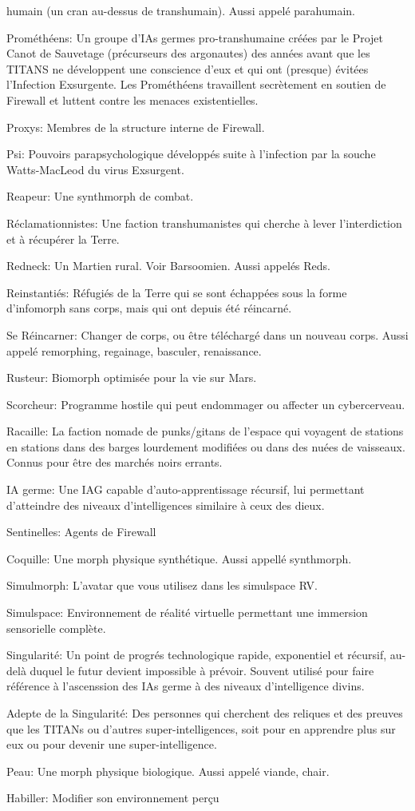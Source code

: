 humain (un cran au-dessus de transhumain). Aussi appelé parahumain. \item Prométhéens: Un groupe d'IAs germes pro-transhumaine créées par le Projet Canot de Sauvetage (précurseurs des argonautes) des années avant que les TITANS ne développent une conscience d'eux et qui ont (presque) évitées l'Infection Exsurgente. Les Prométhéens travaillent secrètement en soutien de Firewall et luttent contre les menaces existentielles. \item Proxys: Membres de la structure interne de Firewall. \item Psi: Pouvoirs parapsychologique développés suite à l'infection par la souche Watts-MacLeod du virus Exsurgent. \item Reapeur: Une synthmorph de combat. \item Réclamationnistes: Une faction transhumanistes qui cherche à lever l'interdiction et à récupérer la Terre. \item Redneck: Un Martien rural. Voir Barsoomien. Aussi appelés Reds. \item Reinstantiés: Réfugiés de la Terre qui se sont échappées sous la forme d'infomorph sans corps, mais qui ont depuis été réincarné. \item Se Réincarner: Changer de corps, ou être téléchargé dans un nouveau corps. Aussi appelé remorphing, regainage, basculer, renaissance. \item Rusteur: Biomorph optimisée pour la vie sur Mars. \item Scorcheur: Programme hostile qui peut endommager ou affecter un cybercerveau. \item Racaille: La faction nomade de punks/gitans de l'espace qui voyagent de stations en stations dans des barges lourdement modifiées ou dans des nuées de vaisseaux. Connus pour être des marchés noirs errants. \item IA germe: Une IAG capable d'auto-apprentissage récursif, lui permettant d'atteindre des niveaux d'intelligences similaire à ceux des dieux. \item Sentinelles: Agents de Firewall \item Coquille: Une morph physique synthétique. Aussi appellé synthmorph. \item Simulmorph: L'avatar que vous utilisez dans les simulspace RV. \item Simulspace: Environnement de réalité virtuelle permettant une immersion sensorielle complète. \item Singularité: Un point de progrés technologique rapide, exponentiel et récursif, au-delà duquel le futur devient impossible à prévoir. Souvent utilisé pour faire référence à l'ascenssion des IAs germe à des niveaux d'intelligence divins. \item Adepte de la Singularité: Des personnes qui cherchent des reliques et des preuves que les TITANs ou d'autres super-intelligences, soit pour en apprendre plus sur eux ou pour devenir une super-intelligence. \item Peau: Une morph physique biologique. Aussi appelé viande, chair. \item Habiller: Modifier son environnement perçu 